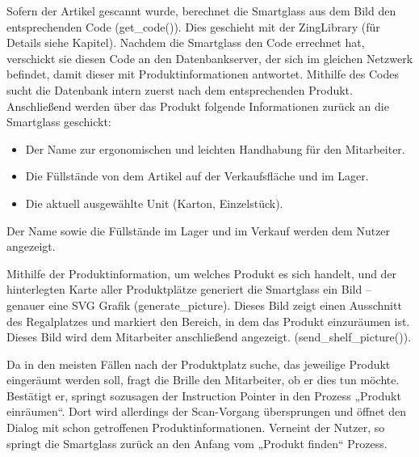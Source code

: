 Sofern der Artikel gescannt wurde, berechnet die Smartglass aus dem Bild den entsprechenden Code (get\_code()). Dies geschieht mit der ZingLibrary (für Details siehe Kapitel). Nachdem die Smartglass den Code errechnet hat, verschickt sie diesen Code an den Datenbankserver, der sich im gleichen Netzwerk befindet, damit dieser mit Produktinformationen antwortet. Mithilfe des Codes sucht die Datenbank intern zuerst nach dem entsprechenden Produkt. Anschließend werden über das Produkt folgende Informationen zurück an die Smartglass geschickt:
\begin{itemize}
	\item Der Name zur ergonomischen und leichten Handhabung für den Mitarbeiter.
	\item Die Füllstände von dem Artikel auf der Verkaufsfläche und im  Lager.
	\item Die aktuell ausgewählte Unit (Karton, Einzelstück).
\end{itemize}
Der Name sowie die Füllstände im Lager und im Verkauf werden dem Nutzer angezeigt.

Mithilfe der Produktinformation, um welches Produkt es sich handelt, und der hinterlegten Karte aller Produktplätze generiert die Smartglass ein Bild – genauer eine SVG Grafik (generate\_picture). Dieses Bild zeigt einen Ausschnitt des Regalplatzes und markiert den Bereich, in dem das Produkt einzuräumen ist. Dieses Bild wird dem Mitarbeiter anschließend angezeigt. (send\_shelf\_picture()).

Da in den meisten Fällen nach der Produktplatz suche, das jeweilige Produkt eingeräumt werden soll, fragt die Brille den Mitarbeiter, ob er dies tun möchte.
Bestätigt er, springt sozusagen der Instruction Pointer in den Prozess „Produkt einräumen“. Dort wird allerdings der Scan-Vorgang übersprungen und öffnet den Dialog mit schon getroffenen Produktinformationen. 
Verneint der Nutzer, so springt die Smartglass zurück an den Anfang vom „Produkt finden“ Prozess. 

